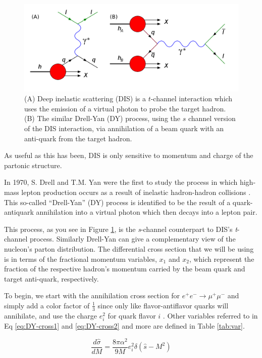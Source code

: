 \begin{figure}[h]
	\centering
	\includegraphics[width=4.50in]{figures/background/DIS-DY.png}
	\caption{(A) Deep inelastic scattering (DIS) is a $t$-channel interaction which uses the emission of a virtual photon to probe the target hadron. (B) The similar Drell-Yan (DY) process, using the $s$ channel version of the DIS interaction, via annihilation of a beam quark with an anti-quark from the target hadron.}
	\label{fig:dis-dy}
\end{figure}

As useful as this has been, DIS is only sensitive to momentum and charge of the partonic structure.

In 1970, S. Drell and T.M. Yan were the first to study the process in which high-mass lepton production occurs as a result of inelastic hadron-hadron collisions \cite{Drell:1970wh}.  This so-called ``Drell-Yan'' (DY) process is identified to be the result of a quark-antiquark annihilation into a virtual photon which then decays into a lepton pair. 

This process, as you see in Figure \ref{fig:dis-dy}, is the \emph{s}-channel counterpart to DIS's \emph{t}-channel process.  Similarly Drell-Yan can give a complementary view of the nucleon's parton distribution. The differential cross section that we will be using is in terms of the fractional momentum variables, $x_1$ and $x_2$, which represent the fraction of the respective hadron's momentum carried by the beam quark and target anti-quark, respectively.

To begin, we start with the annihilation cross section for $e^+e^- \rightarrow \mu^+\mu^-$ and simply add a color factor of $\frac{1}{3}$ since only like flavor-antiflavor quarks will annihilate, and use the charge $e_i^2$ for quark flavor $i$ \cite{duan-2007-50}. Other variables referred to in Eq \ref{eq:DY-cross1} and \ref{eq:DY-cross2} and more are defined in Table \ref{tab:var}.

\begin{equation}
\frac{d\hat{\sigma}}{dM} = \frac{8 \pi \alpha^2}{9M}e_i^2\delta(\hat{s} - M^2)
\label{eq:DY-cross1}
\end{equation}

